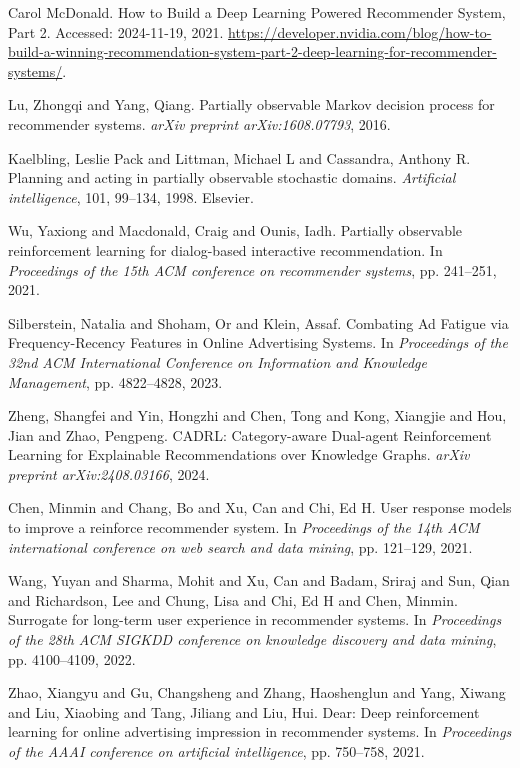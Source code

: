 \begin{thebibliography}{99}
 Carol McDonald. {H}ow to {B}uild a {D}eep {L}earning {P}owered {R}ecommender {S}ystem, {P}art 2. Accessed: 2024-11-19, 2021. \url{https://developer.nvidia.com/blog/how-to-build-a-winning-recommendation-system-part-2-deep-learning-for-recommender-systems/}.

 Lu, Zhongqi and Yang, Qiang. {P}artially observable {M}arkov decision process for recommender systems. \textit{arXiv preprint arXiv:1608.07793}, 2016.

 Kaelbling, Leslie Pack and Littman, Michael L and Cassandra, Anthony R. {P}lanning and acting in partially observable stochastic domains. \textit{Artificial intelligence}, 101, 99--134, 1998. Elsevier.

 Wu, Yaxiong and Macdonald, Craig and Ounis, Iadh. {P}artially observable reinforcement learning for dialog-based interactive recommendation. In \textit{Proceedings of the 15th ACM conference on recommender systems}, pp. 241--251, 2021.

 Silberstein, Natalia and Shoham, Or and Klein, Assaf. {C}ombating {A}d {F}atigue via {F}requency-{R}ecency {F}eatures in {O}nline {A}dvertising {S}ystems. In \textit{Proceedings of the 32nd ACM International Conference on Information and Knowledge Management}, pp. 4822--4828, 2023.

 Zheng, Shangfei and Yin, Hongzhi and Chen, Tong and Kong, Xiangjie and Hou, Jian and Zhao, Pengpeng. C{A}DR{L}: {C}ategory-aware {D}ual-agent {R}einforcement {L}earning for {E}xplainable {R}ecommendations over {K}nowledge {G}raphs. \textit{arXiv preprint arXiv:2408.03166}, 2024.

 Chen, Minmin and Chang, Bo and Xu, Can and Chi, Ed H. {U}ser response models to improve a reinforce recommender system. In \textit{Proceedings of the 14th ACM international conference on web search and data mining}, pp. 121--129, 2021.

 Wang, Yuyan and Sharma, Mohit and Xu, Can and Badam, Sriraj and Sun, Qian and Richardson, Lee and Chung, Lisa and Chi, Ed H and Chen, Minmin. {S}urrogate for long-term user experience in recommender systems. In \textit{Proceedings of the 28th ACM SIGKDD conference on knowledge discovery and data mining}, pp. 4100--4109, 2022.

 Zhao, Xiangyu and Gu, Changsheng and Zhang, Haoshenglun and Yang, Xiwang and Liu, Xiaobing and Tang, Jiliang and Liu, Hui. {D}ear: {D}eep reinforcement learning for online advertising impression in recommender systems. In \textit{Proceedings of the AAAI conference on artificial intelligence}, pp. 750--758, 2021.


\end{thebibliography}
